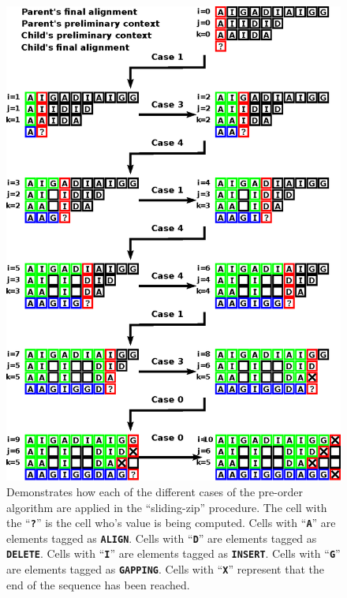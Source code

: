 \documentclass{bmcart}
\begin{document}
\begin{backmatter}
	\begin{figure}[h!]
		\caption{
			Demonstrates how each of the different cases of the pre-order algorithm are applied in the ``sliding-zip'' procedure.
			\newline
			The cell with the ``\textbf{\texttt{?}}'' is the cell who's value is being computed.
			\newline
			Cells with ``\textbf{\texttt{A}}'' are elements tagged as \textbf{\texttt{ALIGN}}.
			\newline 
			Cells with ``\textbf{\texttt{D}}'' are elements tagged as \textbf{\texttt{DELETE}}.
			\newline 
			Cells with ``\textbf{\texttt{I}}'' are elements tagged as \textbf{\texttt{INSERT}}.
			\newline
			Cells with ``\textbf{\texttt{G}}'' are elements tagged as \textbf{\texttt{GAPPING}}.
			\newline
			Cells with ``\textbf{\texttt{X}}'' represent that the end of the sequence has been reached.
		}
		\label{Fig:Examplepre-order}
		\vspace{2ex}
		\includegraphics{example-preorder.eps}
	\end{figure}
	

\end{backmatter}
\end{document}
